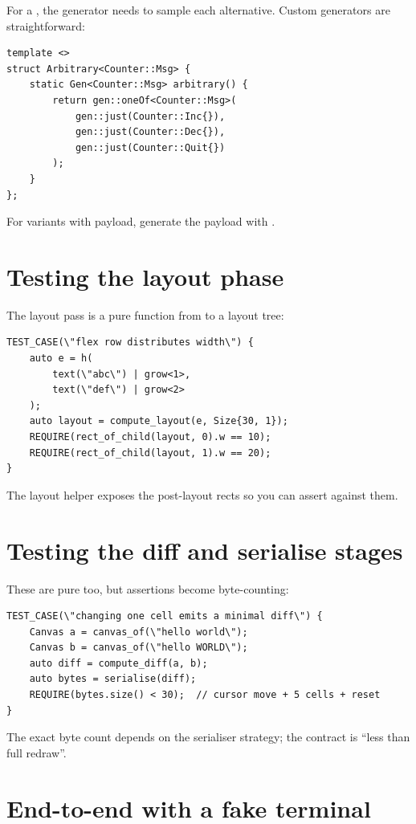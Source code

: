 For a , the generator needs to
sample each alternative. Custom generators are straightforward:

\begin{lstlisting}
template <>
struct Arbitrary<Counter::Msg> {
    static Gen<Counter::Msg> arbitrary() {
        return gen::oneOf<Counter::Msg>(
            gen::just(Counter::Inc{}),
            gen::just(Counter::Dec{}),
            gen::just(Counter::Quit{})
        );
    }
};
\end{lstlisting}

For variants with payload, generate the payload with
.

\section{Testing the layout phase}

The layout pass is a pure function from
 to a layout tree:

\begin{lstlisting}
TEST_CASE(\"flex row distributes width\") {
    auto e = h(
        text(\"abc\") | grow<1>,
        text(\"def\") | grow<2>
    );
    auto layout = compute_layout(e, Size{30, 1});
    REQUIRE(rect_of_child(layout, 0).w == 10);
    REQUIRE(rect_of_child(layout, 1).w == 20);
}
\end{lstlisting}

The layout helper exposes the post-layout rects so you can
assert against them.

\section{Testing the diff and serialise stages}

These are pure too, but assertions become byte-counting:

\begin{lstlisting}
TEST_CASE(\"changing one cell emits a minimal diff\") {
    Canvas a = canvas_of(\"hello world\");
    Canvas b = canvas_of(\"hello WORLD\");
    auto diff = compute_diff(a, b);
    auto bytes = serialise(diff);
    REQUIRE(bytes.size() < 30);  // cursor move + 5 cells + reset
}
\end{lstlisting}

The exact byte count depends on the serialiser strategy; the
contract is ``less than full redraw''.

\section{End-to-end with a fake terminal}

